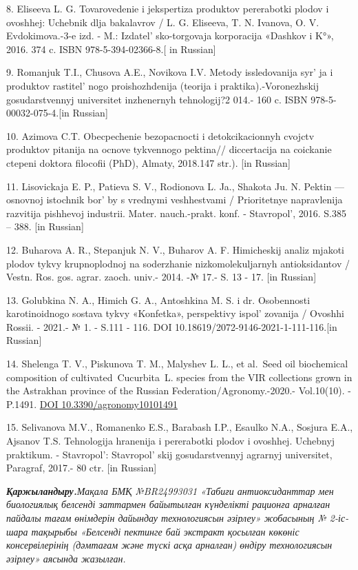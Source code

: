8. Eliseeva L. G. Tovarovedenie i jekspertiza produktov pererabotki
plodov i ovoshhej: Uchebnik dlja bakalavrov / L. G. Eliseeva, T. N.
Ivanova, O. V. Evdokimova.-3-e izd. - M.:
Izdatel' sko-torgovaja korporacija «Dashkov i K°», 2016.
374 c. ISBN 978-5-394-02366-8.{[} in Russian{]}

9. Romanjuk T.I., Chusova A.E., Novikova I.V. Metody issledovanija
syr' ja i produktov rastitel' nogo
proishozhdenija (teorija i praktika).-Voronezhskij gosudarstvennyj
universitet inzhenernyh tehnologij?2 014.- 160 c. ISBN
978-5-00032-075-4.{[}in Russian{]}

10. Azimova C.T. Obecpechenie bezopacnocti i detokcikacionnyh cvojctv
produktov pitanija na ocnove tykvennogo pektina// diccertacija na
coickanie ctepeni doktora filocofii (PhD), Almaty, 2018.147 str.).
{[}in Russian{]}

11. Lisovickaja E. P., Patieva S. V., Rodionova L. Ja., Shakota Ju. N.
Pektin --- osnovnoj istochnik bor' by s vrednymi
veshhestvami / Prioritetnye napravlenija razvitija pishhevoj industrii.
Mater. nauch.-prakt. konf. - Stavropol', 2016. S.385 --
388. {[}in Russian{]}

12. Buharova A. R., Stepanjuk N. V., Buharov A. F. Himicheskij analiz
mjakoti plodov tykvy krupnoplodnoj na soderzhanie nizkomolekuljarnyh
antioksidantov / Vestn. Ros. gos. agrar. zaoch. univ.- 2014. -№ 17.- S.
13 - 17. {[}in Russian{]}

13. Golubkina N. A., Himich G. A., Antoshkina M. S. i dr. Osobennosti
karotinoidnogo sostava tykvy «Konfetka», perspektivy
ispol' zovanija / Ovoshhi Rossii. - 2021.- № 1. - S.111
- 116. DOI 10.18619/2072-9146-2021-1-111-116.{[}in Russian{]}

14. Shelenga T. V., Piskunova T. M., Malyshev L. L., et al.~Seed oil
biochemical composition of cultivated~Cucurbita~L. species from the VIR
collections grown in the Astrakhan province of the Russian
Federation/Agronomy.-2020.- Vol.10(10). -P.1491.
\href{https://doi.org/10.3390/agronomy10101491}{DOI
10.3390/agronomy10101491}

15. Selivanova M.V., Romanenko E.S., Barabash I.P., Esaulko N.A.,
Sosjura E.A., Ajsanov T.S. Tehnologija hranenija i pererabotki plodov i
ovoshhej. Uchebnyj praktikum. - Stavropol':
Stavropol' skij gosudarstvennyj agrarnyj universitet,
Paragraf, 2017.- 80 ctr. {[}in Russian{]}

\emph{{\bfseries Қаржыландыру.}Мақала БМҚ №BR24993031 «Табиғи
антиоксиданттар мен биологиялық белсенді заттармен байытылған күнделікті
рационға арналған пайдалы тағам өнімдерін дайындау технологиясын
әзірлеу» жобасының № 2-іс-шара тақырыбы «Белсенді пектинге бай экстракт
қосылған көкөніс консервілерінің (дәмтағам және түскі асқа арналған)
өндіру технологиясын әзірлеу» аясында жазылған.}

